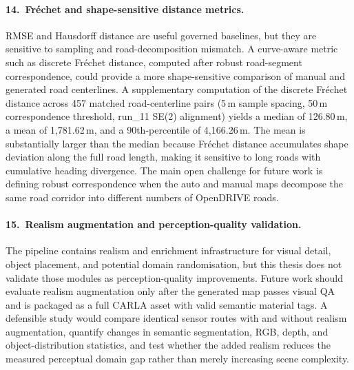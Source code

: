 \paragraph{14.\ Fr\'{e}chet and shape-sensitive distance metrics.}
RMSE and Hausdorff distance are useful governed baselines, but they are sensitive to sampling and road-decomposition mismatch. A curve-aware metric such as discrete Fr\'{e}chet distance, computed after robust road-segment correspondence, could provide a more shape-sensitive comparison of manual and generated road centerlines. A supplementary computation of the discrete Fr\'{e}chet distance across 457 matched road-centerline pairs (5\,m sample spacing, 50\,m correspondence threshold, run\_11 SE(2) alignment) yields a median of 126.80\,m, a mean of 1{,}781.62\,m, and a 90th-percentile of 4{,}166.26\,m. The mean is substantially larger than the median because Fr\'{e}chet distance accumulates shape deviation along the full road length, making it sensitive to long roads with cumulative heading divergence. The main open challenge for future work is defining robust correspondence when the auto and manual maps decompose the same road corridor into different numbers of OpenDRIVE roads.

\paragraph{15.\ Realism augmentation and perception-quality validation.}
The pipeline contains realism and enrichment infrastructure for visual detail, object placement, and potential domain randomisation, but this thesis does not validate those modules as perception-quality improvements. Future work should evaluate realism augmentation only after the generated map passes visual QA and is packaged as a full CARLA asset with valid semantic material tags. A defensible study would compare identical sensor routes with and without realism augmentation, quantify changes in semantic segmentation, RGB, depth, and object-distribution statistics, and test whether the added realism reduces the measured perceptual domain gap rather than merely increasing scene complexity.
